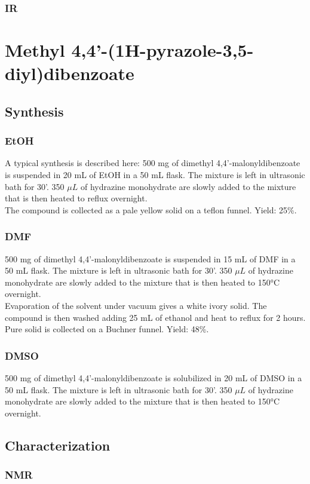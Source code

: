 \documentclass[../Master.tex]{subfiles}
\begin{document}
\subsubsection{IR}
\section{Methyl 4,4'-(1H-pyrazole-3,5-diyl)dibenzoate}
\subsection{Synthesis}
\subsubsection{EtOH}
A typical synthesis is described here:
500 mg of dimethyl 4,4'-malonyldibenzoate is suspended in 20 mL of EtOH in a 50 mL flask. The mixture is left in ultrasonic bath for 30'. 350 \(\mu L\) of hydrazine monohydrate are slowly added to the mixture that is then heated to reflux overnight.\\
The compound is collected as a pale yellow solid on a teflon funnel. Yield: 25\%.
\subsubsection{DMF}
500 mg of dimethyl 4,4'-malonyldibenzoate is suspended in 15 mL of DMF in a 50 mL flask. The mixture is left in ultrasonic bath for 30'. 350 \(\mu L\) of hydrazine monohydrate are slowly added to the mixture that is then heated to 150°C overnight.\\
Evaporation of the solvent under vacuum gives a white ivory solid. The compound is then washed adding 25 mL of ethanol and heat to reflux for 2 hours. Pure solid is collected on a Buchner funnel. Yield: 48\%.
\subsubsection{DMSO}
500 mg of dimethyl 4,4'-malonyldibenzoate is solubilized in 20 mL of DMSO in a 50 mL flask. The mixture is left in ultrasonic bath for 30'. 350 \(\mu L\) of hydrazine monohydrate are slowly added to the mixture that is then heated to 150°C overnight.\\
\pagebreak
\subsection{Characterization}
\subsubsection{NMR}
\end{document}
